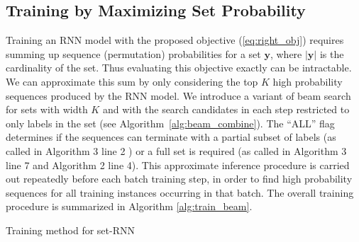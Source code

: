 \subsection{Training by Maximizing Set Probability}
Training an RNN model with the proposed objective (\ref{eq:right_obj}) requires summing up sequence (permutation) probabilities for a set $\mathbf{y}$, where $|\mathbf{y}|$ is the cardinality of the set. Thus evaluating this objective exactly can be intractable. We can approximate this sum by only considering the top $K$ high probability sequences produced by the RNN model. We introduce a variant of beam search for sets with width $K$ and with the search candidates in each step restricted to only labels in the set (see Algorithm~\ref{alg:beam_combine}). The ``ALL'' flag determines if the sequences can terminate with a partial subset of labels (as called in Algorithm 3 line 2 ) or a full set is required (as called in Algorithm 3 line 7 and Algorithm 2 line 4). This approximate inference procedure is carried out repeatedly before each batch training step, in order to find high probability sequences for all training instances occurring in that batch. The overall training procedure is summarized in Algorithm \ref{alg:train_beam}.%

\begin{algorithm}

    
    \caption{Training method for set-RNN}
    \label{alg:train_beam}
\end{algorithm}


